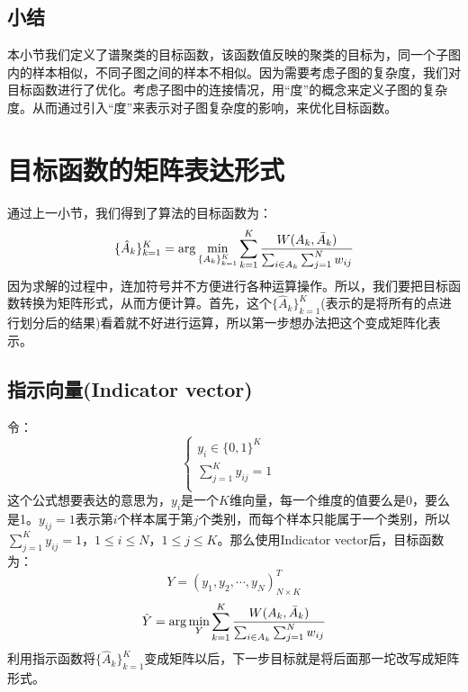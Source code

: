 \documentclass[a4paper]{article}
\begin{document}
\subsection{小结}
本小节我们定义了谱聚类的目标函数，该函数值反映的聚类的目标为，同一个子图内的样本相似，不同子图之间的样本不相似。因为需要考虑子图的复杂度，我们对目标函数进行了优化。考虑子图中的连接情况，用“度”的概念来定义子图的复杂度。从而通过引入“度”来表示对子图复杂度的影响，来优化目标函数。

\section{目标函数的矩阵表达形式}
通过上一小节，我们得到了算法的目标函数为：
\begin{equation}
    \{ \hat{A}_k \}_{k=1}^K = \arg\min_{\{A_k\}_{k=1}^K} \sum_{k=1}^K\frac{ W(A_k,\Bar{A}_k)}{\sum_{i\in A_k} \sum_{j=1}^N w_{ij}}  
\end{equation}
因为求解的过程中，连加符号并不方便进行各种运算操作。所以，我们要把目标函数转换为矩阵形式，从而方便计算。首先，这个$\{ \hat{A}_k \}_{k=1}^K$(表示的是将所有的点进行划分后的结果)看着就不好进行运算，所以第一步想办法把这个变成矩阵化表示。
\subsection{指示向量(Indicator vector)}
令：
$$
\left\{
\begin{array}{ll}
      y_i \in \{0,1\}^K & \\
      \sum_{j=1}^K y_{ij} = 1 & \\
\end{array}
\right.
$$
这个公式想要表达的意思为，$y_i$是一个$K$维向量，每一个维度的值要么是0，要么是1。$y_{ij} = 1$表示第$i$个样本属于第$j$个类别，而每个样本只能属于一个类别，所以$\sum_{j=1}^K y_{ij} = 1$，$1\leq i \leq N$，$1\leq j \leq K$。那么使用Indicator vector后，目标函数为：
$$
Y = (y_1,y_2,\cdots,y_N)^T_{N\times K}
$$
$$
\hat{Y} = \arg\min_{Y} \sum_{k=1}^K \frac{ W(A_k,\Bar{A}_k)}{\sum_{i\in A_k} \sum_{j=1}^N w_{ij}} 
$$
利用指示函数将$\{ \hat{A}_k \}_{k=1}^K$变成矩阵以后，下一步目标就是将后面那一坨改写成矩阵形式。
\end{document}
